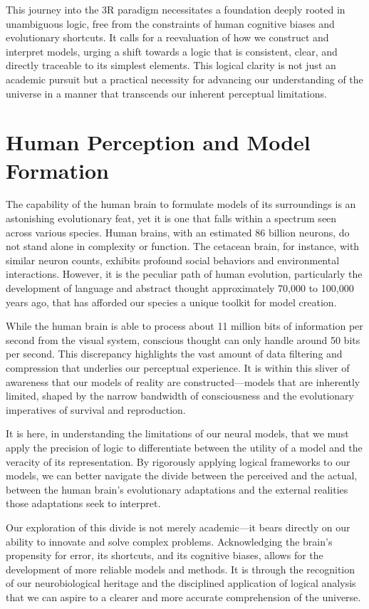 \documentclass[12pt]{article}
\begin{document}
This journey into the 3R paradigm necessitates a foundation deeply rooted in unambiguous logic, free from the constraints of human cognitive biases and evolutionary shortcuts. It calls for a reevaluation of how we construct and interpret models, urging a shift towards a logic that is consistent, clear, and directly traceable to its simplest elements. This logical clarity is not just an academic pursuit but a practical necessity for advancing our understanding of the universe in a manner that transcends our inherent perceptual limitations.

\section*{Human Perception and Model Formation}
The capability of the human brain to formulate models of its surroundings is an astonishing evolutionary feat, yet it is one that falls within a spectrum seen across various species. Human brains, with an estimated 86 billion neurons, do not stand alone in complexity or function. The cetacean brain, for instance, with similar neuron counts, exhibits profound social behaviors and environmental interactions. However, it is the peculiar path of human evolution, particularly the development of language and abstract thought approximately 70,000 to 100,000 years ago, that has afforded our species a unique toolkit for model creation.

While the human brain is able to process about 11 million bits of information per second from the visual system, conscious thought can only handle around 50 bits per second. This discrepancy highlights the vast amount of data filtering and compression that underlies our perceptual experience. It is within this sliver of awareness that our models of reality are constructed—models that are inherently limited, shaped by the narrow bandwidth of consciousness and the evolutionary imperatives of survival and reproduction.

It is here, in understanding the limitations of our neural models, that we must apply the precision of logic to differentiate between the utility of a model and the veracity of its representation. By rigorously applying logical frameworks to our models, we can better navigate the divide between the perceived and the actual, between the human brain's evolutionary adaptations and the external realities those adaptations seek to interpret.

Our exploration of this divide is not merely academic—it bears directly on our ability to innovate and solve complex problems. Acknowledging the brain's propensity for error, its shortcuts, and its cognitive biases, allows for the development of more reliable models and methods. It is through the recognition of our neurobiological heritage and the disciplined application of logical analysis that we can aspire to a clearer and more accurate comprehension of the universe.
\end{document}
